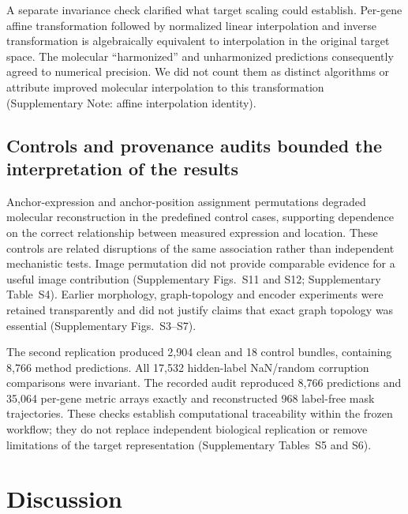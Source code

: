 A separate invariance check clarified what target scaling could establish. Per-gene affine transformation followed by normalized linear interpolation and inverse transformation is algebraically equivalent to interpolation in the original target space. The molecular ``harmonized'' and unharmonized predictions consequently agreed to numerical precision. We did not count them as distinct algorithms or attribute improved molecular interpolation to this transformation (Supplementary Note: affine interpolation identity).

\subsection{Controls and provenance audits bounded the interpretation of the results}
Anchor-expression and anchor-position assignment permutations degraded molecular reconstruction in the predefined control cases, supporting dependence on the correct relationship between measured expression and location. These controls are related disruptions of the same association rather than independent mechanistic tests. Image permutation did not provide comparable evidence for a useful image contribution (Supplementary Figs.~S11 and S12; Supplementary Table~S4). Earlier morphology, graph-topology and encoder experiments were retained transparently and did not justify claims that exact graph topology was essential (Supplementary Figs.~S3--S7).

The second replication produced 2,904 clean and 18 control bundles, containing 8,766 method predictions. All 17,532 hidden-label NaN/random corruption comparisons were invariant. The recorded audit reproduced 8,766 predictions and 35,064 per-gene metric arrays exactly and reconstructed 968 label-free mask trajectories. These checks establish computational traceability within the frozen workflow; they do not replace independent biological replication or remove limitations of the target representation (Supplementary Tables~S5 and S6).

\section{Discussion}
